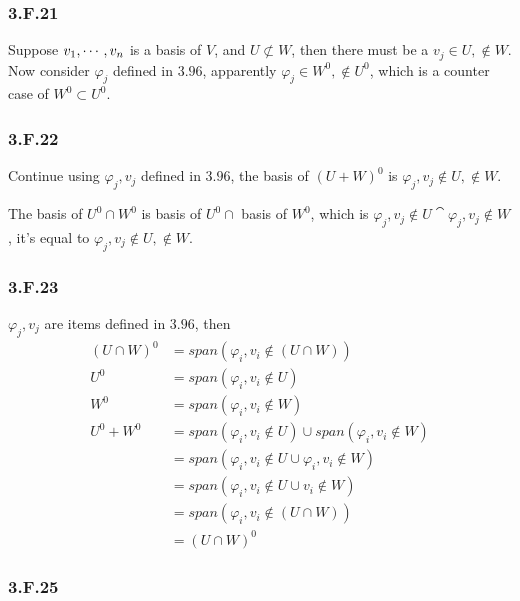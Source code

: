 \subsubsection*{3.F.21}

Suppose $v_{1},\cdots,v_{n}$ is a basis of $V$, and $U\not\subset W$, then there must be a $v_{j} \in U, \notin W$. Now consider 
$\varphi_{j}$ defined in $3.96$, apparently $\varphi_{j} \in W^{0}, \notin U^{0}$, which is a counter case of $W^{0} \subset U^{0}$.

\subsubsection*{3.F.22}
Continue using $\varphi_{j}, v_{j}$ defined in $3.96$, the basis of $(U+W)^{0}$ is ${\varphi_{j}, v_{j} \notin U, \notin W}$.

The basis of $U^{0} \cap W^{0}$ is basis of $U^{0} \cap $ basis of $ W^{0}$, 
which is ${\varphi_{j}, v_{j} \notin U} \cat {\varphi_{j}, v_{j} \notin W}$, 
it's equal to ${\varphi_{j}, v_{j} \notin U, \notin W}$.

\subsubsection*{3.F.23}

$\varphi_{j}, v_{j}$ are items defined in $3.96$, then
\begin{equation*}
    \begin{split}
(U \cap W)^{0} &= span({\varphi_{i}, v_{i} \notin (U \cap W)}) \\
U^{0} &= span({\varphi_{i}, v_{i} \notin U}) \\
W^{0} &= span({\varphi_{i}, v_{i} \notin W}) \\
U^{0} + W^{0} &= span({\varphi_{i}, v_{i} \notin U}) \cup span({\varphi_{i}, v_{i} \notin W}) \\
&= span({\varphi_{i}, v_{i} \notin U} \cup {\varphi_{i}, v_{i} \notin W}) \\
&= span({\varphi_{i}, v_{i} \notin U \cup  v_{i} \notin W}) \\
&= span({\varphi_{i}, v_{i} \notin (U \cap W)}) \\
&= (U \cap W)^{0}
\end{split}
\end{equation*}

\subsubsection*{3.F.25}

